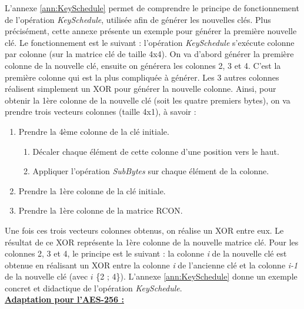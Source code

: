 \documentclass[oneside]{book}
\begin{document}
\hspace{-0.5cm}L'annexe \ref{ann:KeySchedule} permet de comprendre le principe de fonctionnement de l'opération \textit{KeySchedule}, utilisée afin de générer les nouvelles clés. Plus précisément, cette annexe présente un exemple pour générer la première nouvelle clé. Le fonctionnement est le suivant : l'opération \textit{KeySchedule} s'exécute colonne par colonne (sur la matrice clé de taille 4x4). On va d'abord générer la première colonne de la nouvelle clé, ensuite on générera les colonnes 2, 3 et 4. C'est la première colonne qui est la plus compliquée à générer. Les 3 autres colonnes réalisent simplement un XOR pour générer la nouvelle colonne.
Ainsi, pour obtenir la 1ère colonne de la nouvelle clé (soit les quatre premiers bytes), on va prendre trois vecteurs colonnes (taille 4x1), à savoir : 
\begin{enumerate}
\item Prendre la 4ème colonne de la clé initiale.
\begin{enumerate}
\item Décaler chaque élément de cette colonne d'une position vers le haut.
\item Appliquer l'opération \textit{SubBytes} sur chaque élément de la colonne.
\end{enumerate}
\item Prendre la 1ère colonne de la clé initiale.
\item Prendre la 1ère colonne de la matrice RCON.
\end{enumerate}
Une fois ces trois vecteurs colonnes obtenus, on réalise un XOR entre eux. Le résultat de ce XOR représente la 1ère colonne de la nouvelle matrice clé. Pour les colonnes 2, 3 et 4, le principe est le suivant : la colonne \textit{i} de la nouvelle clé est obtenue en réalisant un XOR entre la colonne \textit{i} de l'ancienne clé et la colonne \textit{i-1} de la nouvelle clé (avec $i$ {\epsilon} \{2 ; 4\}). L'annexe \ref{ann:KeySchedule} donne un exemple concret et didactique de l'opération \textit{KeySchedule}. \\

\underline{\textbf{Adaptation pour l'AES-256 :}} 
\end{document}
